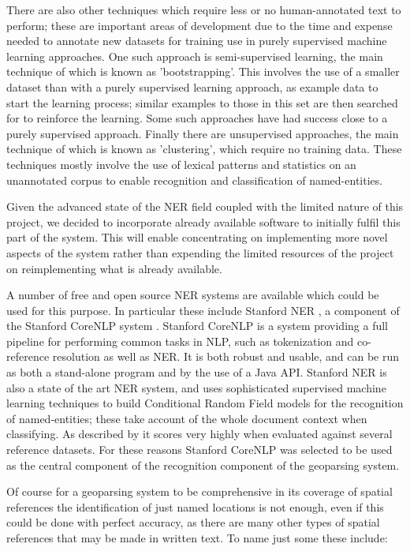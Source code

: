 \documentclass[12pt, a4paper]{report}
\begin{document}
There are also other techniques which require less or no human-annotated text to perform; these are important areas of development due to the time and expense needed to annotate new datasets for training use in purely supervised machine learning approaches. One such approach is semi-supervised learning, the main technique of which is known as 'bootstrapping'. This involves the use of a smaller dataset than with a purely supervised learning approach, as example data to start the learning process; similar examples to those in this set are then searched for to reinforce the learning. Some such approaches have had success close to a purely supervised approach. Finally there are unsupervised approaches, the main technique of which is known as 'clustering', which require no training data. These techniques mostly involve the use of lexical patterns and statistics on an unannotated corpus to enable recognition and classification of named-entities.

Given the advanced state of the NER field coupled with the limited nature of this project, we decided to incorporate already available software to initially fulfil this part of the system. This  will enable concentrating on implementing more novel aspects of the system rather than expending the limited resources of the project on reimplementing what is already available.

A number of free and open source NER systems are available which could be used for this purpose. In particular these include Stanford NER \citep{finkel2005}, a component of the Stanford CoreNLP system \citep{manning2014}. Stanford CoreNLP is a system providing a full pipeline for performing common tasks in NLP, such as tokenization and co-reference resolution as well as NER. It is both robust and usable, and can be run as both a stand-alone program and by the use of a Java API. Stanford NER is also a state of the art NER system, and uses sophisticated supervised machine learning techniques to build Conditional Random Field models for the recognition of named-entities; these take account of the whole document context when classifying. As described by \citet{finkel2005} it scores very highly when evaluated against several reference datasets. For these reasons Stanford CoreNLP was selected to be used as the central component of the recognition component of the geoparsing system.

Of course for a geoparsing system to be comprehensive in its coverage of spatial references the identification of just named locations is not enough, even if this could be done with perfect accuracy, as there are many other types of spatial references that may be made in written text. To name just some these include:
\end{document}
